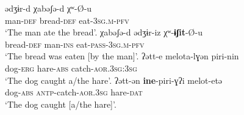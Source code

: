 \ea {} \citep[235]{belay:2015}
	\ea\label{ex:Khimtanga:eat:a}
	\gll	ədʒɨr-d 			χabəʃə-d 			χʷ-Ø-u					\\
			man-\textsc{def}	bread-\textsc{def}	eat-\textsc{3sg.m-pfv}	\\
	\glt	‘The man ate the bread’.
	\ex\label{ex:Khimtanga:eat:b}
	\gll	χabəʃə-d {\ob}ədʒɨr-iz{\cb} χʷ-\textbf{ɨʃit}-Ø-u \\
			bread-\textsc{def} {\db}man-\textsc{ins} eat-\textsc{pass-3sg.m-pfv} \\
	\glt	‘The bread was eaten [by the man]’.
	\z
\z
\ea {} \citep[314]{polinsky:2017}
	\ea\label{ex:Chukchi:catch:a}
	\gll	ʔətt-e 				melota-lɣən 		piri-nin 					\\
			dog-\textsc{erg}	hare-\textsc{abs}	catch-\textsc{aor.3sg:3sg}	\\
	\glt	‘The dog caught a/the hare’.
	\ex\label{ex:Chukchi:catch:b}
	\gll	ʔətt-ən \textbf{ine}-piri-ɣʔi {\ob}melot-etə{\cb} \\
			dog-\textsc{abs} \textsc{antp}-catch-\textsc{aor.3sg} {\db}hare-\textsc{dat} \\
	\glt	‘The dog caught [a/the hare]’.
	\z
\z


